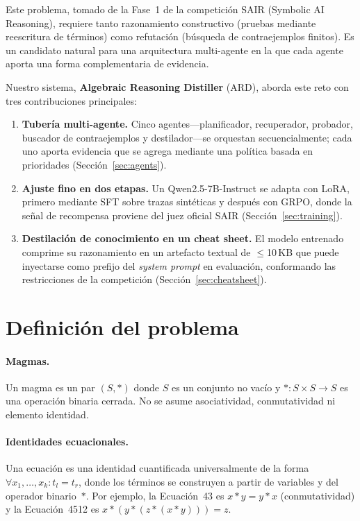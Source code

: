 \documentclass{article}
\begin{document}
Este problema, tomado de la Fase~1 de la competici\'on SAIR (Symbolic AI Reasoning), requiere tanto razonamiento constructivo (pruebas mediante reescritura de t\'erminos) como refutaci\'on (b\'usqueda de contraejemplos finitos). Es un candidato natural para una arquitectura multi-agente en la que cada agente aporta una forma complementaria de evidencia.

Nuestro sistema, \textbf{Algebraic Reasoning Distiller} (ARD), aborda este reto con tres contribuciones principales:

\begin{enumerate}[leftmargin=*,itemsep=2pt]
  \item \textbf{Tuber\'ia multi-agente.} Cinco agentes---planificador, recuperador, probador, buscador de contraejemplos y destilador---se orquestan secuencialmente; cada uno aporta evidencia que se agrega mediante una pol\'itica basada en prioridades (Secci\'on~\ref{sec:agents}).
  \item \textbf{Ajuste fino en dos etapas.} Un Qwen2.5-7B-Instruct se adapta con LoRA, primero mediante SFT sobre trazas sint\'eticas y despu\'es con GRPO, donde la se\~nal de recompensa proviene del juez oficial SAIR (Secci\'on~\ref{sec:training}).
  \item \textbf{Destilaci\'on de conocimiento en un cheat sheet.} El modelo entrenado comprime su razonamiento en un artefacto textual de $\leq$10\,KB que puede inyectarse como prefijo del \textit{system prompt} en evaluaci\'on, conformando las restricciones de la competici\'on (Secci\'on~\ref{sec:cheatsheet}).
\end{enumerate}

\section{Definici\'on del problema}
\label{sec:problem}

\paragraph{Magmas.} Un magma es un par $(S, *)$ donde $S$ es un conjunto no vac\'io y $*\colon S \times S \to S$ es una operaci\'on binaria cerrada. No se asume asociatividad, conmutatividad ni elemento identidad.

\paragraph{Identidades ecuacionales.} Una ecuaci\'on es una identidad cuantificada universalmente de la forma $\forall x_1,\dots,x_k\colon t_l = t_r$, donde los t\'erminos se construyen a partir de variables y del operador binario~$*$. Por ejemplo, la Ecuaci\'on~43 es $x * y = y * x$ (conmutatividad) y la Ecuaci\'on~4512 es $x * (y * (z * (x * y))) = z$.
\end{document}
